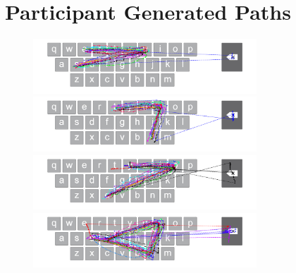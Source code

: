 \chapter{Participant Generated Paths} \label{user_generated_paths}

\begin{figure}[!b]
    \centering
	\begin{minipage}[t]{8in}
	\hspace{-20pt}
	\begin{minipage}[t]{3.1in}
		\includegraphics[width=3.3in]{Figures/fig_sue_paths}
	\end{minipage}
	\begin{minipage}[t]{3in}
		\includegraphics[width=3.3in]{Figures/fig_tin_paths}
	\end{minipage}
	\end{minipage}
	
	\begin{minipage}[t]{8in}
	\hspace{-20pt}
	\begin{minipage}[t]{3.1in}
		\includegraphics[width=3.3in]{Figures/fig_coy_paths}
	\end{minipage}
	\begin{minipage}[t]{3in}
		\includegraphics[width=3.3in]{Figures/fig_find_paths}
	\end{minipage}
	\end{minipage}
	

\end{figure}
